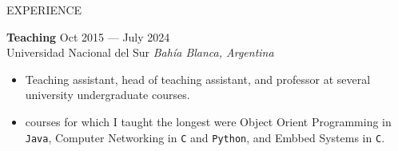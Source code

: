 \documentclass{resume} %
\begin{document}
\begin{rSection}{EXPERIENCE}





\textbf{Teaching} \hfill Oct 2015 --- July 2024\\
Universidad Nacional del Sur \hfill \textit{Bahía Blanca, Argentina}\\
\vspace{-0.7cm}

\begin{itemize}
    \item Teaching assistant, head of teaching assistant, and professor at several university undergraduate courses.
    \vspace{-0.25cm}
    \item courses for which I taught the longest were Object Orient Programming in \texttt{Java}, Computer Networking in \texttt{C} and \texttt{Python}, and Embbed Systems in \texttt{C}. 
\end{itemize}

\end{rSection} 
\end{document}
